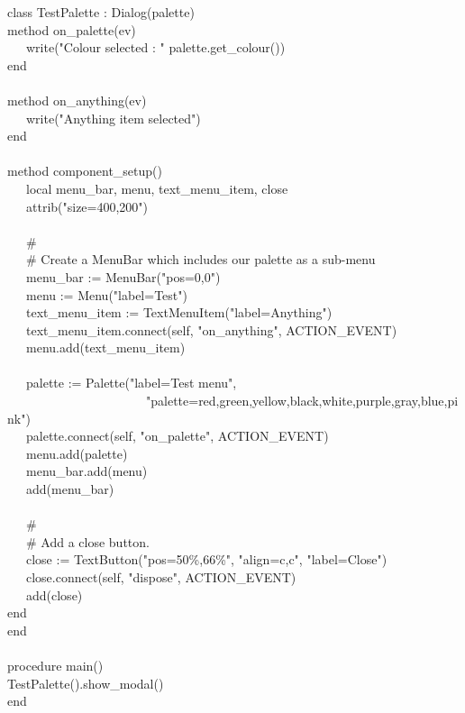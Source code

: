 {class TestPalette : Dialog(palette) \\
\>   method on\_palette(ev) \\
\>   \ \ \ write("Colour selected : "
{\textbar}{\textbar} palette.get\_colour()) \\
\>   end \\
\ \\
\>   method on\_anything(ev) \\
\>   \ \ \ write("Anything item selected") \\
\>   end \\
\ \\
\>   method component\_setup() \\
\>   \ \ \ local menu\_bar, menu, text\_menu\_item, close \\
\>   \ \ \ attrib("size=400,200") \\
\ \\
\>   \ \ \ \# \\
\>   \ \ \ \# Create a MenuBar which includes our palette as a sub-menu \\
\>   \ \ \ menu\_bar := MenuBar("pos=0,0") \\
\>   \ \ \ menu := Menu("label=Test") \\
\>   \ \ \ text\_menu\_item := TextMenuItem("label=Anything") \\
\>   \ \ \ text\_menu\_item.connect(self, "on\_anything", ACTION\_EVENT) \\
\>   \ \ \ menu.add(text\_menu\_item) \\
\ \\
\>   \ \ \ palette := Palette("label=Test menu", \\
\>   \ \ \ \ \ \ \ \ \ \ \ \ \ \ \ \ \ \ \ \ \ \ "palette=red,green,yellow,black,white,purple,gray,blue,pink") \\
\>   \ \ \ palette.connect(self, "on\_palette", ACTION\_EVENT) \\
\>   \ \ \ menu.add(palette) \\
\>   \ \ \ menu\_bar.add(menu) \\
\>   \ \ \ add(menu\_bar) \\
\ \\
\>   \ \ \ \# \\
\>   \ \ \ \# Add a close button.\\
\>   \ \ \ close := TextButton("pos=50\%,66\%", "align=c,c", "label=Close") \\
\>   \ \ \ close.connect(self, "dispose", ACTION\_EVENT) \\
\>   \ \ \ add(close) \\
\>   end \\
end \\
\ \\
procedure main() \\
\>   TestPalette().show\_modal() \\
end
}

